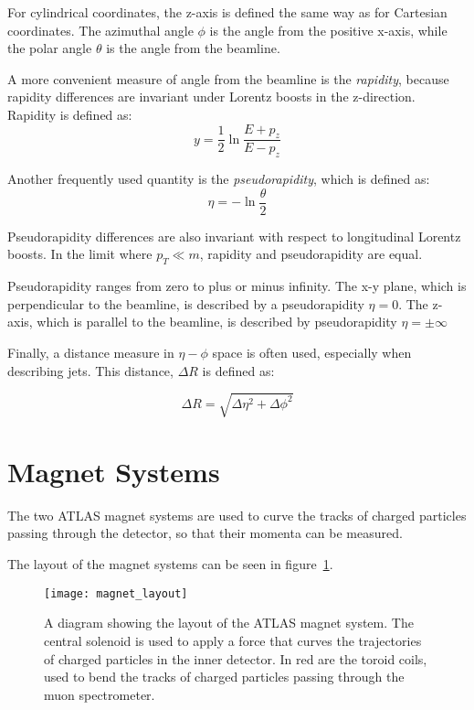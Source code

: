 For cylindrical coordinates, the z-axis is defined the same way as for
Cartesian coordinates. The azimuthal angle $\phi$ is the angle
from the positive x-axis, while the polar angle $\theta$ is the angle
from the beamline.

A more convenient measure of angle from the beamline is the
\textit{rapidity}, because rapidity differences are invariant under Lorentz boosts in the
z-direction.
Rapidity is defined as:
\begin{equation}
y = \frac{1}{2}\ln\frac{E+p_z}{E-p_z}
\end{equation}

Another frequently used quantity is the
\textit{pseudorapidity}, which is defined as:
\begin{equation}
\eta = -\ln\frac{\theta}{2}
\end{equation}

Pseudorapidity differences are also invariant with respect to
longitudinal Lorentz boosts. In the limit where $p_T \ll m$, rapidity and
pseudorapidity are equal.

Pseudorapidity ranges from zero to plus or minus infinity.
The x-y plane, which is perpendicular to the beamline, is described by a pseudorapidity $\eta=0$.
The z-axis, which is parallel to the beamline, is described by pseudorapidity $\eta=\pm\infty$

Finally, a distance measure in $\eta-\phi$ space is often used, especially when describing jets.
This distance, $\Delta R$ is defined as:

\begin{equation}
\Delta R = \sqrt{\Delta\eta^2+\Delta\phi^2}
\end{equation}

\section{Magnet Systems}\label{sec:magnet_systems}
The two ATLAS magnet systems are used to curve the tracks of charged particles passing through the detector,
so that their momenta can be measured.

The layout of the magnet systems can be seen in figure~\ref{fig:magnet_layout}.

\begin{figure}[!ht]\centering
\texttt{[image: magnet\_layout]}
\caption{A diagram showing the layout of the ATLAS magnet system.
The central solenoid is used to apply a force that curves the trajectories of charged particles in the inner detector.
In red are the toroid coils, used to bend the tracks of charged particles passing through the muon spectrometer.}
\label{fig:magnet_layout}
\end{figure}

